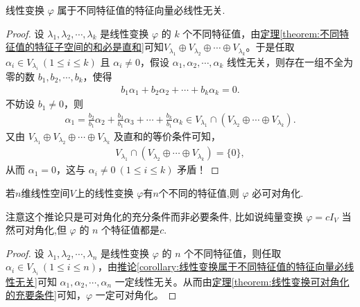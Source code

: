 \documentclass[lang=cn,newtx,10pt,scheme=chinese]{elegantbook}
\begin{document}
\begin{corollary}\label{corollary:线性变换属于不同特征值的特征向量必线性无关}
线性变换 $\varphi$ 属于不同特征值的特征向量必线性无关.
\end{corollary}
\begin{proof}
设 $\lambda_1, \lambda_2, \cdots, \lambda_k$ 是线性变换 $\varphi$ 的 $k$ 个不同特征值，由\hyperref[theorem:不同特征值的特征子空间的和必是直和]{定理\ref{theorem:不同特征值的特征子空间的和必是直和}}可知$V_{\lambda_1} \oplus V_{\lambda_2} \oplus \cdots \oplus V_{\lambda_k}$。于是任取 $\alpha_i \in V_{\lambda_i} \ (1 \leqslant i \leqslant k)$ 且 $\alpha_i \ne 0$，假设 $\alpha_1, \alpha_2, \cdots, \alpha_k$ 线性无关，则存在一组不全为零的数 $b_1, b_2, \cdots, b_k$，使得
\begin{align*}
b_1 \alpha_1 + b_2 \alpha_2 + \cdots + b_k \alpha_k = 0.
\end{align*}
不妨设 $b_1 \ne 0$，则
\begin{align*}
\alpha_1 = \frac{b_2}{b_1} \alpha_2 + \frac{b_3}{b_1} \alpha_3 + \cdots + \frac{b_k}{b_1} \alpha_k \in V_{\lambda_1} \cap \left( V_{\lambda_2} \oplus \cdots \oplus V_{\lambda_k} \right).
\end{align*}
又由 $V_{\lambda_1} \oplus V_{\lambda_2} \oplus \cdots \oplus V_{\lambda_k}$ 及直和的等价条件可知，
\begin{align*}
V_{\lambda_1} \cap \left( V_{\lambda_2} \oplus \cdots \oplus V_{\lambda_k} \right) = \{ 0 \},
\end{align*}
从而 $\alpha_1 = 0$，这与 $\alpha_i \ne 0 \ (1 \leqslant i \leqslant k)$ 矛盾！
\end{proof}

\begin{corollary}
若$n$维线性空间$V$上的线性变换 $\varphi$有$n$个不同的特征值,则 $\varphi$ 必可对角化.
\end{corollary}
\begin{note}
注意这个推论只是可对角化的充分条件而非必要条件, 比如说纯量变换 $\varphi = cI_V$ 当然可对角化,但 $\varphi$ 的 $n$ 个特征值都是$c$.
\end{note}
\begin{proof}
设 $\lambda_1, \lambda_2, \cdots, \lambda_n$ 是线性变换 $\varphi$ 的 $n$ 个不同特征值，则任取 $\alpha_i \in V_{\lambda_i} \ (1 \leqslant i \leqslant n)$，由\hyperref[corollary:线性变换属于不同特征值的特征向量必线性无关]{推论\ref{corollary:线性变换属于不同特征值的特征向量必线性无关}}可知 $\alpha_1, \alpha_2, \cdots, \alpha_n$ 一定线性无关。从而由\hyperref[theorem:线性变换可对角化的充要条件]{定理\ref{theorem:线性变换可对角化的充要条件}}可知，$\varphi$ 一定可对角化。
\end{proof}
\end{document}
